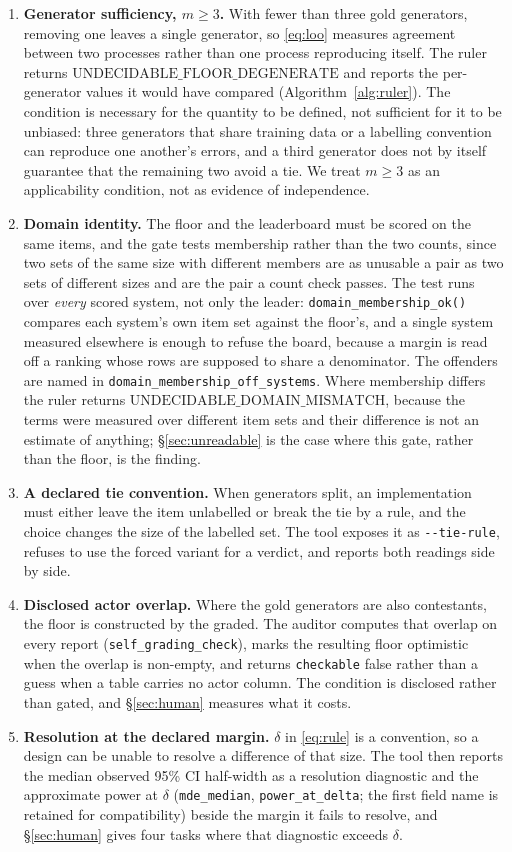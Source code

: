 \documentclass{article}
\newcommand{\ids}[1]{\texttt{\small #1}} %
\begin{document}
\begin{enumerate}[leftmargin=*, itemsep=1pt]
\item \textbf{Generator sufficiency, $m \ge 3$.} With fewer than three gold generators, removing one leaves a single generator, so \eqref{eq:loo} measures agreement between two processes rather than one process reproducing itself. The ruler returns $\mathrm{UNDECIDABLE\_FLOOR\_DEGENERATE}$ and reports the per-generator values it would have compared (Algorithm~\ref{alg:ruler}). The condition is necessary for the quantity to be defined, not sufficient for it to be unbiased: three generators that share training data or a labelling convention can reproduce one another's errors, and a third generator does not by itself guarantee that the remaining two avoid a tie. We treat $m\ge3$ as an applicability condition, not as evidence of independence.
\item \textbf{Domain identity.} The floor and the leaderboard must be scored on the same items, and the gate tests membership rather than the two counts, since two sets of the same size with different members are as unusable a pair as two sets of different sizes and are the pair a count check passes. The test runs over \emph{every} scored system, not only the leader: \ids{domain\_membership\_ok()} compares each system's own item set against the floor's, and a single system measured elsewhere is enough to refuse the board, because a margin is read off a ranking whose rows are supposed to share a denominator. The offenders are named in \texttt{domain\_membership\_off\_systems}. Where membership differs the ruler returns $\mathrm{UNDECIDABLE\_DOMAIN\_MISMATCH}$, because the terms were measured over different item sets and their difference is not an estimate of anything; \S\ref{sec:unreadable} is the case where this gate, rather than the floor, is the finding.
\item \textbf{A declared tie convention.} When generators split, an implementation must either leave the item unlabelled or break the tie by a rule, and the choice changes the size of the labelled set. The tool exposes it as \texttt{-{}-tie-rule}, refuses to use the forced variant for a verdict, and reports both readings side by side.
\item \textbf{Disclosed actor overlap.} Where the gold generators are also contestants, the floor is constructed by the graded. The auditor computes that overlap on every report (\mbox{\ids{self\_grading\_check}}), marks the resulting floor optimistic when the overlap is non-empty, and returns \ids{checkable} false rather than a guess when a table carries no actor column. The condition is disclosed rather than gated, and \S\ref{sec:human} measures what it costs.
\item \textbf{Resolution at the declared margin.} $\delta$ in \eqref{eq:rule} is a convention, so a design can be unable to resolve a difference of that size. The tool then reports the median observed 95\% CI half-width as a resolution diagnostic and the approximate power at $\delta$ (\ids{mde\_median}, \ids{power\_at\_delta}; the first field name is retained for compatibility) beside the margin it fails to resolve, and \S\ref{sec:human} gives four tasks where that diagnostic exceeds $\delta$.
\end{enumerate}
\end{document}
